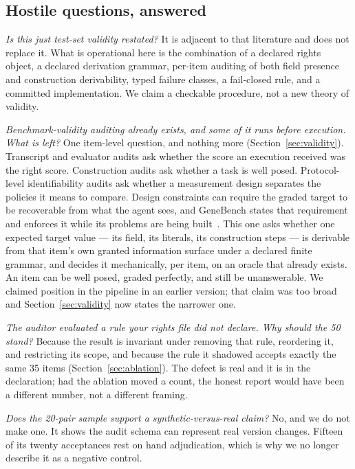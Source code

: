 \documentclass[11pt]{article}
\begin{document}
\subsection{Hostile questions, answered}

\emph{Is this just test-set validity restated?} It is adjacent to that
literature and does not replace it. What is operational here is the
combination of a declared rights object, a declared derivation grammar,
per-item auditing of both field presence and construction derivability, typed
failure classes, a fail-closed rule, and a committed implementation. We claim a
checkable procedure, not a new theory of validity.

\emph{Benchmark-validity auditing already exists, and some of it runs before
execution. What is left?} One item-level question, and nothing more
(Section~\ref{sec:validity}). Transcript and evaluator audits ask whether the
score an execution received was the right score. Construction audits ask
whether a task is well posed. Protocol-level identifiability audits ask whether
a measurement design separates the policies it means to compare. Design
constraints can require the graded target to be recoverable from what the agent
sees, and GeneBench states that requirement and enforces it while its problems
are being built~\cite{li2026genebench}. This one asks whether one expected
target value --- its field, its literals, its construction steps --- is
derivable from that item's own granted information surface under a declared
finite grammar, and decides it mechanically, per item, on an oracle that
already exists. An item can be well posed, graded perfectly, and still be
unanswerable. We claimed position in
the pipeline in an earlier version; that claim was too broad and
Section~\ref{sec:validity} now states the narrower one.

\emph{The auditor evaluated a rule your rights file did not declare. Why should
the 50 stand?} Because the result is invariant under removing that rule,
reordering it, and restricting its scope, and because the rule it shadowed
accepts exactly the same 35 items (Section~\ref{sec:ablation}). The defect is
real and it is in the declaration; had the ablation moved a count, the honest
report would have been a different number, not a different framing.

\emph{Does the 20-pair sample support a synthetic-versus-real claim?} No, and
we do not make one. It shows the audit schema can represent real version
changes. Fifteen of its twenty acceptances rest on hand adjudication, which is
why we no longer describe it as a negative control.
\end{document}
